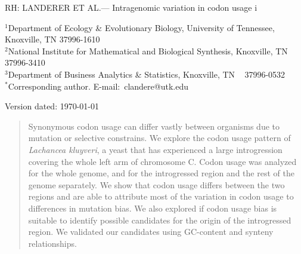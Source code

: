 \documentclass[letter,12pt]{article}
\begin{document}
\doublespacing
\linenumbers



\noindent RH: LANDERER ET AL.--- Intragenomic variation in codon usage
i
\bigskip
\medskip
\begin{center}

\bigskip





\end{center}

\vfill

{\small
\noindent$^{1}$Department of Ecology \& Evolutionary Biology, University of Tennessee, Knoxville, TN 37996-1610\\
\noindent$^{2}$National Institute for Mathematical and Biological Synthesis, Knoxville, TN 37996-3410\\
\noindent$^{3}$Department of Business Analytics \& Statistics, Knoxville, TN ~ 37996-0532 \\
\noindent$^{*}$Corresponding author. E-mail:~clandere@utk.edu
}

\vfill
\centerline{Version dated: \today}
\vfill
\newpage

\begin{abstract}
Synonymous codon usage can differ vastly between organisms due to mutation or selective constrains. 
We explore the codon usage pattern of \textit{Lachancea kluyveri}, a yeast that has experienced a large introgression covering the whole left arm of chromosome C.
Codon usage was analyzed for the whole genome, and for the introgressed region and the rest of the genome separately.
We show that codon usage differs between the two regions and are able to attribute most of the variation in codon usage to differences in mutation bias.
We also explored if codon usage bias is suitable to identify possible candidates for the origin of the introgressed region.
We validated our candidates using GC-content and synteny relationships.
\end{abstract}
\end{document}
